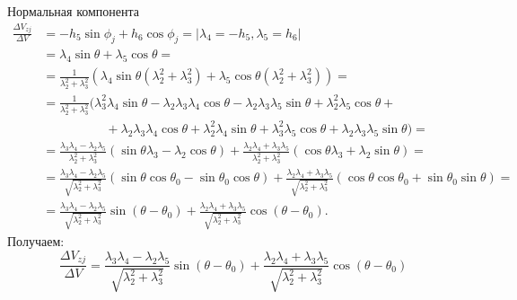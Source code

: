 \documentclass[9pt]{beamer}
\begin{document}
\begin{frame}{Нормальная компонента}
\begin{equation*}
    \begin{aligned}
        \frac{\Delta V_{zj}}{\Delta V} &= -h_5 \sin \phi_j + h_6 \cos \phi_j = \vert \lambda_4 = -h_5, \lambda_5 = h_6 \vert \\
        &= \lambda_4 \sin \theta + \lambda_5 \cos \theta = \\
        &= \frac{1}{\lambda_2^2 + \lambda_3^2} \left( \lambda_4 \sin \theta (\lambda_2^2 + \lambda_3^2) + \lambda_5 \cos \theta (\lambda_2^2 + \lambda_3^2) \right) = \\
        &= \frac{1}{\lambda_2^2 + \lambda_3^2} \bigl( \lambda_3^2 \lambda_4 \sin \theta - \lambda_2 \lambda_3 \lambda_4 \cos \theta - \lambda_2 \lambda_3 \lambda_5 \sin \theta + \lambda_2^2 \lambda_5 \cos \theta + \\ 
        & \quad \quad \quad \quad \quad + \lambda_2 \lambda_3 \lambda_4 \cos \theta + \lambda_2^2 \lambda_4 \sin \theta + \lambda_3^2 \lambda_5 \cos \theta + \lambda_2 \lambda_3 \lambda_5 \sin \theta \bigr) = \\
        &= \frac{\lambda_3 \lambda_4 - \lambda_2 \lambda_5}{\lambda_2^2 + \lambda_3^2} \left( \sin \theta \lambda_3 - \lambda_2 \cos \theta \right) + \frac{\lambda_2 \lambda_4 + \lambda_3 \lambda_5}{\lambda_2^2 + \lambda_3^2} \left( \cos \theta \lambda_3 + \lambda_2 \sin \theta \right) = \\
        &= \frac{\lambda_3 \lambda_4 - \lambda_2 \lambda_5}{\sqrt{\lambda_2^2 + \lambda_3^2}} \left( \sin \theta \cos \theta_0 - \sin \theta_0 \cos \theta \right) + \frac{\lambda_2 \lambda_4 + \lambda_3 \lambda_5}{\sqrt{\lambda_2^2 + \lambda_3^2}} \left( \cos \theta \cos \theta_0 + \sin \theta_0 \sin \theta \right) = \\
        &= \frac{\lambda_3 \lambda_4 - \lambda_2 \lambda_5}{\sqrt{\lambda_2^2 + \lambda_3^2}} \sin (\theta - \theta_0) + \frac{\lambda_2 \lambda_4 + \lambda_3 \lambda_5}{\sqrt{\lambda_2^2 + \lambda_3^2}} \cos (\theta - \theta_0).
    \end{aligned}
\end{equation*}
Получаем:
\begin{equation*}
    \boxed{\frac{\Delta V_{zj}}{\Delta V} = \frac{\lambda_3 \lambda_4 - \lambda_2 \lambda_5}{\sqrt{\lambda_2^2 + \lambda_3^2}} \sin (\theta - \theta_0) + \frac{\lambda_2 \lambda_4 + \lambda_3 \lambda_5}{\sqrt{\lambda_2^2 + \lambda_3^2}} \cos (\theta - \theta_0)}
\end{equation*}
\end{frame}
\end{document}
